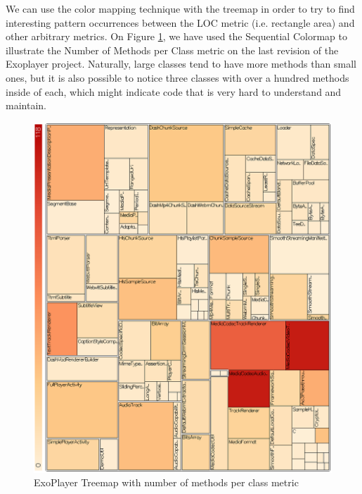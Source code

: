 We can use the color mapping technique with the treemap in order to try to find interesting pattern occurrences between the LOC metric (i.e. rectangle area) and other arbitrary metrics. On Figure \ref{fig:number_methods}, we have used the Sequential Colormap to illustrate the Number of Methods per Class metric on the last revision of the Exoplayer project. Naturally, large classes tend to have more methods than small ones, but it is also possible to notice three classes with over a hundred methods inside of each, which might indicate code that is very hard to understand and maintain.

\begin{figure}[H]
  \centering
  \includegraphics[width=\textwidth]{figures/number_methods}
  \caption{ExoPlayer Treemap with number of methods per class metric }
  \label{fig:number_methods}
\end{figure}
